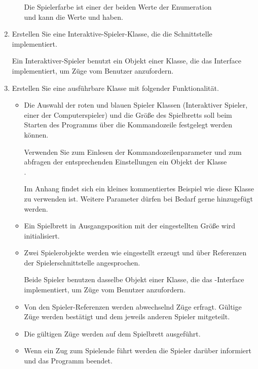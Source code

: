 \begin{enumerate}
\begin{itemize}[leftmargin=4em]
Die Spielerfarbe ist einer der beiden Werte der Enumeration \\
 und kann die Werte  und  haben.
\end{itemize}

\item Erstellen Sie eine Interaktive-Spieler-Klasse, die die Schnittstelle \\  implementiert.

Ein Interaktiver-Spieler benutzt ein Objekt einer Klasse, die das Interface \\  implementiert, um Züge vom Benutzer anzufordern.

\item Erstellen Sie eine ausführbare Klasse mit folgender Funktionalität.
\begin{itemize}
\item Die Auswahl der roten und blauen Spieler Klassen (Interaktiver Spieler, einer der Computerspieler) und die Größe des Spielbretts soll beim Starten des Programms über die Kommandozeile festgelegt werden können.

Verwenden Sie zum Einlesen der Kommandozeilenparameter und zum abfragen der entsprechenden Einstellungen ein Objekt der Klasse \\
.

Im Anhang findet sich ein kleines kommentiertes Beispiel wie diese Klasse zu verwenden ist. Weitere Parameter dürfen bei Bedarf gerne hinzugefügt werden.

\item Ein Spielbrett in Ausgangsposition mit der eingestellten Größe wird initialisiert.
\item Zwei Spielerobjekte werden wie eingestellt erzeugt und über Referenzen der Spielerschnittstelle angesprochen. 

Beide Spieler benutzen dasselbe Objekt einer Klasse, die das -Interface implementiert, um Züge vom Benutzer anzufordern.

\item Von den Spieler-Referenzen werden abwechselnd Züge erfragt. Gültige Züge werden bestätigt und dem jeweils anderen Spieler mitgeteilt.
\item Die gültigen Züge werden auf dem Spielbrett ausgeführt.

\item Wenn ein Zug zum Spielende führt werden die Spieler darüber informiert und das Programm beendet.
\end{itemize}


\end{enumerate}
